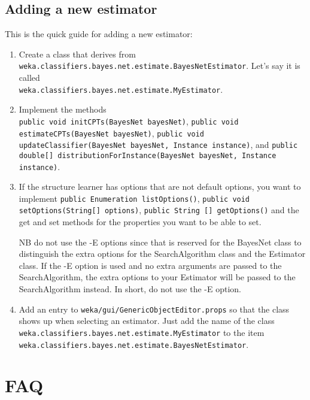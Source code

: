 \documentclass{article}
\begin{document}
\subsection*{Adding a new estimator}

This is the quick guide for adding a new estimator:

\begin{enumerate}
\item Create a class that derives from {\tt weka.classifiers.bayes.net.estimate.BayesNetEstimator}.
  Let's say it is called \\{\tt weka.classifiers.bayes.net.estimate.MyEstimator}.

\item Implement the methods\\
{\tt public void initCPTs(BayesNet bayesNet)},
{\tt public void estimateCPTs(BayesNet bayesNet)},
{\tt public void updateClassifier(BayesNet bayesNet, Instance instance)}, and
{\tt  public double[] distributionForInstance(BayesNet bayesNet, Instance instance)}.

\item If the structure learner has options that are not default options,
you want to implement {\tt public Enumeration listOptions()},
{\tt public void setOptions(String[] options)},
{\tt public String [] getOptions()} and the get and set methods for
the properties you want to be able to set.

NB do not use the -E options since that is reserved for the BayesNet class to 
distinguish the extra options for the SearchAlgorithm class and the Estimator class.
If the -E option is used and no extra arguments are passed to the SearchAlgorithm,
the extra options to your Estimator will be passed to the SearchAlgorithm
instead. In short, do not use the -E option.

\item Add an entry to {\tt weka/gui/GenericObjectEditor.props} so that the class 
shows up when selecting an estimator. Just add the name of the
class\\ {\tt weka.classifiers.bayes.net.estimate.MyEstimator}
to the item\\ {\tt weka.classifiers.bayes.net.estimate.BayesNetEstimator}.
\end{enumerate}

\section{FAQ}
\end{document}
